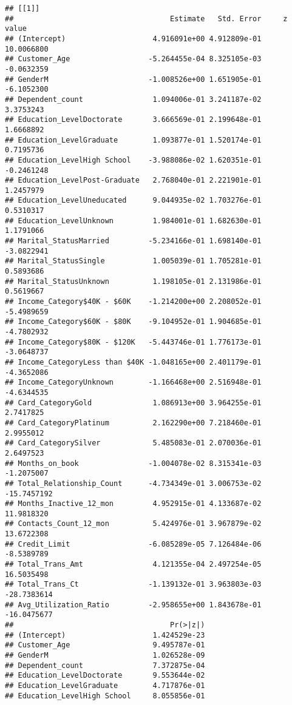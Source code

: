 \documentclass[
]{article}
\begin{document}
\begin{verbatim}
## [[1]]
##                                    Estimate   Std. Error     z value
## (Intercept)                    4.916091e+00 4.912809e-01  10.0066800
## Customer_Age                  -5.264455e-04 8.325105e-03  -0.0632359
## GenderM                       -1.008526e+00 1.651905e-01  -6.1052300
## Dependent_count                1.094006e-01 3.241187e-02   3.3753243
## Education_LevelDoctorate       3.666569e-01 2.199648e-01   1.6668892
## Education_LevelGraduate        1.093877e-01 1.520174e-01   0.7195736
## Education_LevelHigh School    -3.988086e-02 1.620351e-01  -0.2461248
## Education_LevelPost-Graduate   2.768040e-01 2.221901e-01   1.2457979
## Education_LevelUneducated      9.044935e-02 1.703276e-01   0.5310317
## Education_LevelUnknown         1.984001e-01 1.682630e-01   1.1791066
## Marital_StatusMarried         -5.234166e-01 1.698140e-01  -3.0822941
## Marital_StatusSingle           1.005039e-01 1.705281e-01   0.5893686
## Marital_StatusUnknown          1.198105e-01 2.131986e-01   0.5619667
## Income_Category$40K - $60K    -1.214200e+00 2.208052e-01  -5.4989659
## Income_Category$60K - $80K    -9.104952e-01 1.904685e-01  -4.7802932
## Income_Category$80K - $120K   -5.443746e-01 1.776173e-01  -3.0648737
## Income_CategoryLess than $40K -1.048165e+00 2.401179e-01  -4.3652086
## Income_CategoryUnknown        -1.166468e+00 2.516948e-01  -4.6344535
## Card_CategoryGold              1.086913e+00 3.964255e-01   2.7417825
## Card_CategoryPlatinum          2.162290e+00 7.218460e-01   2.9955012
## Card_CategorySilver            5.485083e-01 2.070036e-01   2.6497523
## Months_on_book                -1.004078e-02 8.315341e-03  -1.2075007
## Total_Relationship_Count      -4.734349e-01 3.006753e-02 -15.7457192
## Months_Inactive_12_mon         4.952915e-01 4.133687e-02  11.9818320
## Contacts_Count_12_mon          5.424976e-01 3.967879e-02  13.6722308
## Credit_Limit                  -6.085289e-05 7.126484e-06  -8.5389789
## Total_Trans_Amt                4.121355e-04 2.497254e-05  16.5035498
## Total_Trans_Ct                -1.139132e-01 3.963803e-03 -28.7383614
## Avg_Utilization_Ratio         -2.958655e+00 1.843678e-01 -16.0475677
##                                    Pr(>|z|)
## (Intercept)                    1.424529e-23
## Customer_Age                   9.495787e-01
## GenderM                        1.026528e-09
## Dependent_count                7.372875e-04
## Education_LevelDoctorate       9.553644e-02
## Education_LevelGraduate        4.717876e-01
## Education_LevelHigh School     8.055856e-01

\end{verbatim}
\end{document}
